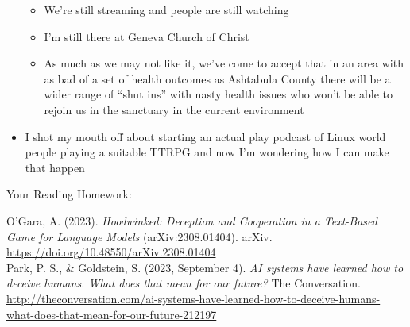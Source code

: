 \begin{itemize}
  \begin{itemize}
  \tightlist
  \item
    We're still streaming and people are still watching
  \item
    I'm still there at Geneva Church of Christ
  \item
    As much as we may not like it, we've come to accept that in an area
    with as bad of a set of health outcomes as Ashtabula County there
    will be a wider range of ``shut ins'' with nasty health issues who
    won't be able to rejoin us in the sanctuary in the current
    environment
  \end{itemize}
\item
  I shot my mouth off about starting an actual play podcast of Linux
  world people playing a suitable TTRPG and now I'm wondering how I can
  make that happen
\end{itemize}

Your Reading Homework:

O'Gara, A. (2023). \emph{Hoodwinked: Deception and Cooperation in a
Text-Based Game for Language Models} (arXiv:2308.01404). arXiv.
\url{https://doi.org/10.48550/arXiv.2308.01404}\\
Park, P. S., \& Goldstein, S. (2023, September 4). \emph{AI systems have
learned how to deceive humans. What does that mean for our future?} The
Conversation.
\url{http://theconversation.com/ai-systems-have-learned-how-to-deceive-humans-what-does-that-mean-for-our-future-212197}
